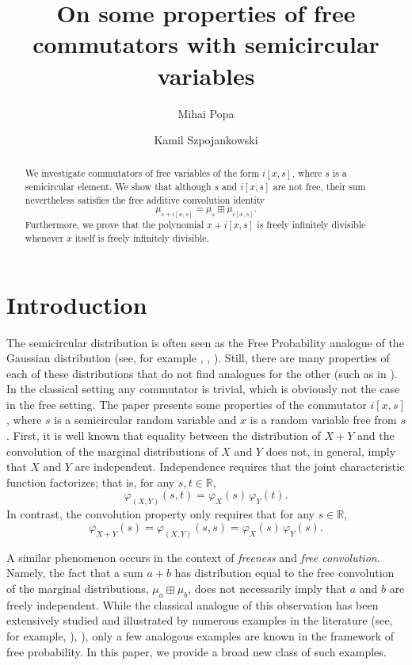 \documentclass{amsart}
\title[] {On some properties of free commutators with semicircular variables}
\author[M. Popa]{Mihai Popa}
\author[K. Szpojankowski]{Kamil Szpojankowski}
\begin{document}
\begin{abstract}
We investigate commutators of free variables of the form \( i[x, s] \), where \( s \) is a semicircular element. We show that although \( s \) and \( i[x, s] \) are not free, their sum nevertheless satisfies the free additive convolution identity
\[
\mu_{s + i[x, s]} = \mu_s \boxplus \mu_{i[x, s]}.
\]
Furthermore, we prove that the polynomial \( x + i[x, s] \) is freely infinitely divisible whenever \( x \) itself is freely infinitely divisible.

\end{abstract}

\maketitle



\section{Introduction}

The semicircular distribution is often seen as the Free Probability analogue of the Gaussian distribution (see, for example \cite{biane}, \cite{mingo-speicher}, \cite{nisp}).
Still, there are many properties of each of these distributions that do not find analogues for the other (such as in \cite{eisembaum}). In the classical setting any commutator is trivial, which is obviously not the case in the free setting. 
%
The  paper presents some properties of the commutator $ i[x, s] $, where $s $ is a semicircular random variable and $ x $ is a random variable free from $ s $.
 First, it is well known that equality between the distribution of \( X + Y \) and the convolution of the marginal distributions of \( X \) and \( Y \) does not, in general, imply that \( X \) and \( Y \) are independent.  
Independence requires that the joint characteristic function factorizes; that is, for any \( s,t \in \mathbb{R} \),
\[
\varphi_{(X,Y)}(s,t) = \varphi_X(s)\,\varphi_Y(t).
\]
In contrast, the convolution property only requires that for any \( s \in \mathbb{R} \),
\[
\varphi_{X+Y}(s) = \varphi_{(X,Y)}(s,s) = \varphi_X(s)\,\varphi_Y(s).
\]

A similar phenomenon occurs in the context of \emph{freeness} and \emph{free convolution}.  
Namely, the fact that a sum \( a + b \) has distribution equal to the free convolution of the marginal distributions, \( \mu_a \boxplus \mu_b \), does not necessarily imply that \( a \) and \( b \) are freely independent.  
While the classical analogue of this observation has been extensively studied and illustrated by numerous examples in the literature (see, for example, \cite{hamedani}), \cite{schennach}), only a few analogous examples are known in the framework of free probability.  
In this paper, we provide a broad new class of such examples.
\end{document}
